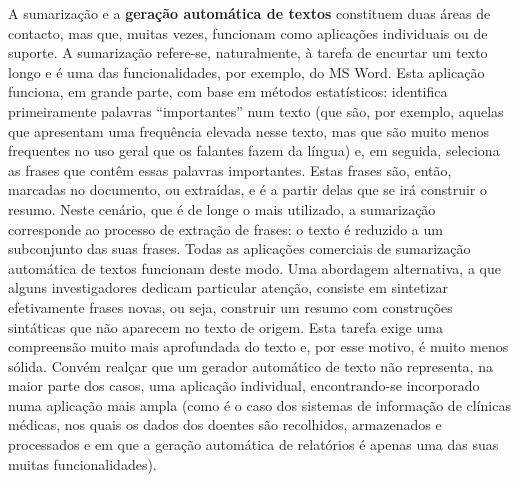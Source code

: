 \begin{multicols}{2}
A sumarização e a \textbf{geração automática de textos} constituem duas áreas de contacto, mas que, muitas vezes, funcionam como aplicações individuais ou de suporte. A sumarização refere-se, naturalmente, à tarefa de encurtar um texto longo e é uma das funcionalidades, por exemplo, do MS Word. Esta aplicação funciona, em grande parte, com base em métodos estatísticos: identifica primeiramente palavras “importantes” num texto (que são, por exemplo, aquelas que apresentam uma frequência elevada nesse texto, mas que são muito menos frequentes no uso geral que os falantes fazem da língua) e, em seguida, seleciona as frases que contêm essas palavras importantes. Estas frases são, então, marcadas no documento, ou extraídas, e é a partir delas que se irá construir o resumo. Neste cenário, que é de longe o mais utilizado, a sumarização cor\-res\-pon\-de ao processo de extração de frases: o texto é reduzido a um subconjunto das suas frases. Todas as aplicações comerciais de sumarização automática de textos funcionam deste modo. Uma abordagem alternativa, a que alguns investigadores dedicam particular atenção, consiste em sintetizar efetivamente frases novas, ou seja, construir um resumo com construções sintáticas que não aparecem no texto de origem. Esta tarefa exige uma compreensão muito mais aprofundada do texto e, por esse motivo, é muito menos sólida. Convém realçar que um gerador automático de texto não representa, na maior parte dos casos, uma aplicação individual, encontrando-se incorporado numa aplicação mais ampla (como é o caso dos sistemas de informação de clínicas médicas, nos quais os dados dos doentes são recolhidos, armazenados e processados e em que a geração automática de relatórios é apenas uma das suas muitas funcionalidades).



\end{multicols}
